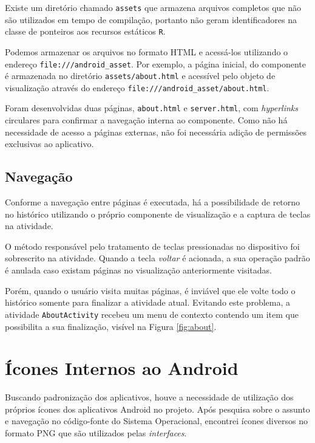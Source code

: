 \documentclass{article}
\begin{document}
Existe um diretório chamado \texttt{assets} que armazena arquivos completos que
não são utilizados em tempo de compilação, portanto não geram identificadores na
classe de ponteiros aos recursos estáticos \texttt{R}.

Podemos armazenar os arquivos no formato HTML e acessá-los utilizando o endereço
\texttt{file:///android\_asset}. Por exemplo, a página inicial,  do componente é
armazenada no diretório \texttt{assets/about.html} e acessível pelo objeto de
visualização através do endereço \texttt{file:///android\_asset/about.html}.

Foram desenvolvidas duas páginas, \texttt{about.html} e \texttt{server.html},
com \emph{hyperlinks} circulares para confirmar a navegação interna ao
componente. Como não há necessidade de acesso a páginas externas, não foi
necessária adição de permissões exclusivas ao aplicativo.

\subsection{Navegação}

Conforme a navegação entre páginas é executada, há a possibilidade de retorno no
histórico utilizando o próprio componente de visualização e a captura de teclas
na atividade.

O método responsável pelo tratamento de teclas pressionadas no dispositivo foi
sobrescrito na atividade. Quando a tecla \emph{voltar} é acionada, a sua
operação padrão é anulada caso existam páginas no visualização anteriormente
visitadas.

Porém, quando o usuário visita muitas páginas, é inviável que ele volte todo o
histórico somente para finalizar a atividade atual. Evitando este problema, a
atividade \texttt{AboutActivity} recebeu um menu de contexto contendo um item
que possibilita a sua finalização, visível na Figura \ref{fig:about}.

\section{Ícones Internos ao Android}
\label{sec:icones}

Buscando padronização dos aplicativos, houve a necessidade de utilização dos
próprios ícones dos aplicativos Android no projeto. Após pesquisa sobre o
assunto e navegação no código-fonte do Sistema Operacional, encontrei ícones
diversos no formato PNG que são utilizados pelas \emph{interfaces}.
\end{document}
